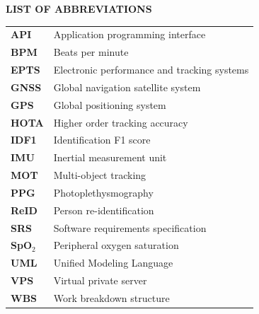 \vspace{0.35cm}
\begin{center}
{\Large\textbf{LIST OF ABBREVIATIONS}}\\
\vspace{0.5cm}
\end{center}
\begin{longtable}{@{}>{\bfseries}p{1.15in}p{4.4in}@{}}
API & Application programming interface\\
BPM & Beats per minute\\
EPTS & Electronic performance and tracking systems\\
GNSS & Global navigation satellite system\\
GPS & Global positioning system\\
HOTA & Higher order tracking accuracy\\
IDF1 & Identification F1 score\\
IMU & Inertial measurement unit\\
MOT & Multi-object tracking\\
PPG & Photoplethysmography\\
ReID & Person re-identification\\
SRS & Software requirements specification\\
SpO$_2$ & Peripheral oxygen saturation\\
UML & Unified Modeling Language\\
VPS & Virtual private server\\
WBS & Work breakdown structure\\
\end{longtable}
